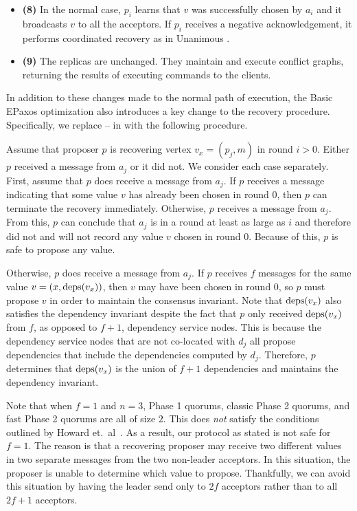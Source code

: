 \begin{itemize}
  \item \textbf{(8)}
    In the normal case, $p_i$ learns that $v$ was successfully chosen by $a_i$
    and it broadcasts $v$ to all the acceptors. If $p_i$ receives a negative
    acknowledgement, it performs coordinated recovery as in Unanimous
    \BPaxos{}.

  \item \textbf{(9)}
    The replicas are unchanged. They maintain and execute conflict graphs,
    returning the results of executing commands to the clients.
\end{itemize}

In addition to these changes made to the normal path of execution, the Basic
EPaxos optimization also introduces a key change to the recovery procedure.
Specifically, we replace  -- 
in  with the following procedure.

Assume that proposer $p$ is recovering vertex $v_x = (p_j, m)$ in round $i >
0$. Either $p$ received a message from $a_j$ or it did not. We consider each
case separately.
%
First, assume that $p$ does receive a message from $a_j$. If $p$ receives a
message indicating that some value $v$ has already been chosen in round $0$,
then $p$ can terminate the recovery immediately. Otherwise, $p$ receives a
 message from $a_j$. From this, $p$ can conclude that $a_j$ is
in a round at least as large as $i$ and therefore did not and will not record
any value $v$ chosen in round $0$. Because of this, $p$ is safe to propose any
value.

Otherwise, $p$ does receive a message from $a_j$. If $p$ receives $f$
 messages for the same value $v = (x, \text{deps}(v_x))$, then
$v$ may have been chosen in round $0$, so $p$ must propose $v$ in order to
maintain the consensus invariant. Note that $\text{deps}(v_x)$ also satisfies the
dependency invariant despite the fact that $p$ only received $\text{deps}(v_x)$ from
$f$, as opposed to $f+1$, dependency service nodes. This is because the
dependency service nodes that are not co-located with $d_j$ all propose
dependencies that include the dependencies computed by $d_j$. Therefore, $p$
determines that $\text{deps}(v_x)$ is the union of $f+1$ dependencies and maintains
the dependency invariant.

Note that when $f = 1$ and $n = 3$, Phase 1 quorums, classic Phase 2 quorums,
and fast Phase 2 quorums are all of size $2$. This does \emph{not} satisfy the
conditions outlined by Howard et.\ al~\cite{howard2021fast}. As a result, our
protocol as stated is not safe for $f=1$. The reason is that a recovering
proposer may receive two different values in two separate 
messages from the two non-leader acceptors. In this situation, the proposer is
unable to determine which value to propose. Thankfully, we can avoid this
situation by having the leader send only to $2f$ acceptors rather than to all
$2f+1$ acceptors.

